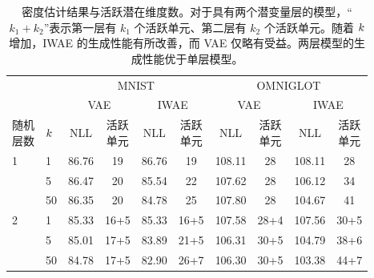 \begin{table}

\begin{center}
\begin{tabular}{@{}ll*{8}{c}@{}}
              &     & \multicolumn{4}{c}{MNIST} & \multicolumn{4}{c}{OMNIGLOT} \\
\cmidrule(r){3-6} \cmidrule(l){7-10} 
              &     & \multicolumn{2}{c}{VAE} & \multicolumn{2}{c}{IWAE} & \multicolumn{2}{c}{VAE} & \multicolumn{2}{c}{IWAE} \\
\cmidrule(r){3-4} \cmidrule(l){5-6} \cmidrule(lr){7-8} \cmidrule(l){9-10} 
\shortstack{随机\\层数} & $k$ & NLL               & \shortstack{活跃\\单元}             & NLL               & \shortstack{活跃\\单元}  & NLL                & \shortstack{活跃\\单元}   & NLL               & \shortstack{活跃\\单元}  \\ 
\cmidrule(lr){1-1} \cmidrule(lr){2-2} \cmidrule(lr){3-3}\cmidrule(lr){4-4}\cmidrule(lr){5-5}\cmidrule(lr){6-6} \cmidrule(lr){7-7}\cmidrule(lr){8-8}\cmidrule(lr){9-9}\cmidrule(lr){10-10}      \midrule
1             & 1   & 86.76 &  19  & 86.76&  19  & 108.11 & 28 & 108.11 & 28 \\
              & 5   & 86.47 &  20  & 85.54&  22  & 107.62 & 28 & 106.12 & 34 \\
              & 50  & 86.35 &  20  & 84.78&  25  & 107.80 & 28 & 104.67 & 41 \\ \midrule
2             & 1   & 85.33 &  16+5 & 85.33&  16+5& 107.58 &28+4& 107.56 & 30+5 \\
              & 5   & 85.01 &  17+5 & 83.89&  21+5& 106.31 &30+5& 104.79 & 38+6 \\
              & 50  & 84.78 &  17+5 & 82.90&  26+7& 106.30 &30+5& 103.38 & 44+7 \\ \bottomrule
\end{tabular}
\end{center}

\caption{密度估计结果与活跃潜在维度数。对于具有两个潜变量层的模型，“$k_1+k_2$”表示第一层有 $k_1$ 个活跃单元、第二层有 $k_2$ 个活跃单元。随着 $k$ 增加，IWAE 的生成性能有所改善，而 VAE 仅略有受益。两层模型的生成性能优于单层模型。}
\label{tbl:results}
\end{table}



